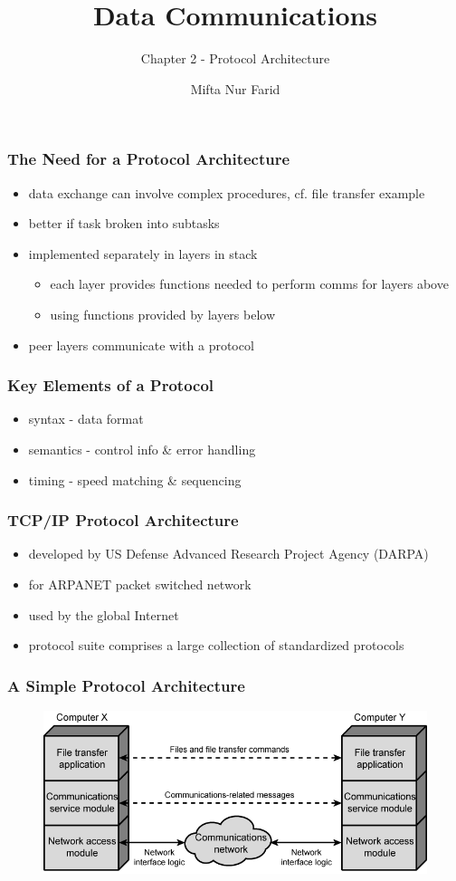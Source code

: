 \documentclass[pdflatex,compress]{beamer}
\title{Data Communications}
\subtitle{Chapter 2 - Protocol Architecture}
\author{Mifta Nur Farid}
\begin{document}
\maketitle

\begin{frame}
	\frametitle{The Need for a Protocol Architecture}
	\begin{itemize}
		\item data exchange can involve complex
		procedures, cf. file transfer example
		\item better if task broken into subtasks
		\item implemented separately in layers in stack
		\begin{itemize}
			\item each layer provides functions needed to
			perform comms for layers above
			\item using functions provided by layers below
		\end{itemize}
		\item peer layers communicate with a protocol
	\end{itemize}
\end{frame}

\begin{frame}
	\frametitle{Key Elements of a Protocol}
	\begin{itemize}
		\item syntax - data format
		\item semantics - control info \& error handling
		\item timing - speed matching \& sequencing
	\end{itemize}
\end{frame}

\begin{frame}
	\frametitle{TCP/IP Protocol Architecture}
	\begin{itemize}
		\item developed by US Defense Advanced Research Project Agency (DARPA)
		\item for ARPANET packet switched network
		\item used by the global Internet
		\item protocol suite comprises a large collection of standardized protocols
	\end{itemize}
\end{frame}

\begin{frame}
	\frametitle{A Simple Protocol Architecture}
	\begin{figure}
		\centering
		\includegraphics[width=\linewidth]{img/img01}
	\end{figure}
\end{frame}
\end{document}
